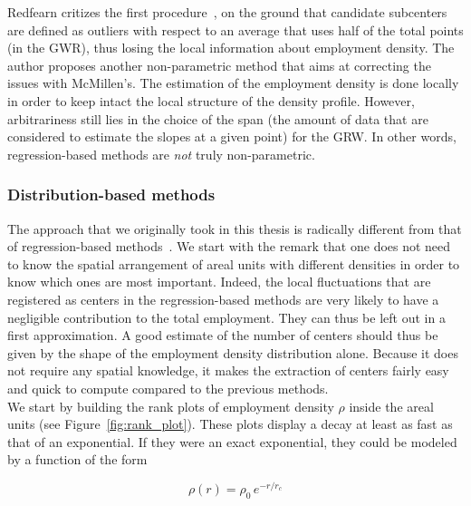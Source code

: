 Redfearn critizes the first procedure~\cite{Redfearn:2007}, on the ground that candidate
subcenters are defined as outliers with respect to an average that uses half of the total
points (in the GWR), thus losing the local information about employment
density. The author proposes another non-parametric method that aims at correcting the issues
with McMillen's\cite{Redfearn:2007}. The estimation of the employment density is
done locally in order to keep intact the local structure of the density profile.
However, arbitrariness still lies in the choice of the span (the amount of data
that are considered to estimate the slopes at a given point) for the GRW. In
other words, regression-based methods are \emph{not} truly non-parametric.\\

\subsubsection{Distribution-based methods}
\label{ssub:distribution_based_methods}


The approach that we originally took in this thesis is radically different from
that of regression-based methods~\cite{Louf:2013_polycentric}. We start with the
remark that one does not need to know the spatial arrangement of areal units
with different densities in order to know which ones are most important. Indeed,
the local fluctuations that are registered as centers in the regression-based
methods are very likely to have a negligible contribution to the total
employment. They can thus be left out in a first approximation. A good estimate
of the number of centers should thus be given by the shape of the employment
density distribution alone. Because it does not require any spatial knowledge,
it makes the extraction of centers fairly easy and quick to compute compared to
the previous methods.\\

We start by building the rank plots of employment density $\rho$ inside the
areal units (see Figure~\ref{fig:rank_plot}). These plots display a decay at least as fast as that of an
exponential. If they were an exact exponential, they could be modeled by a
function of the form

\begin{equation}
    \rho(r) = \rho_0\,e^{-r/r_c}
    \label{eq:}
\end{equation}

